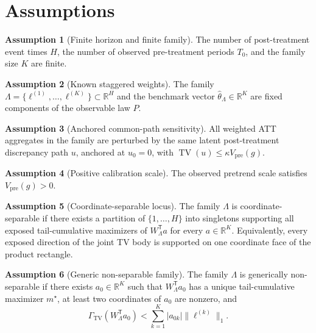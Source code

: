 \documentclass[11pt]{article}
\newcommand{\transpose}{\mathsf{T}}
\newcommand{\R}{\mathbb{R}}
\theoremstyle{definition}
\newtheorem{assumption}{Assumption}
\theoremstyle{plain}
\theoremstyle{remark}
\begin{document}
\section{Assumptions}
\begin{assumption}[Finite horizon and finite family]\label{ass:finite}
The number of post-treatment event times \(H\), the number of observed pre-treatment periods \(T_0\), and the family size \(K\) are finite.
\end{assumption}

\begin{assumption}[Known staggered weights]\label{ass:weights}
The family \(\Lambda=\{\ell^{(1)},\ldots,\ell^{(K)}\}\subset\R^H\) and the benchmark vector \(\hat\theta_\Lambda\in\R^K\) are fixed components of the observable law \(P\).
\end{assumption}

\begin{assumption}[Anchored common-path sensitivity]\label{ass:tv}
All weighted ATT aggregates in the family are perturbed by the same latent post-treatment discrepancy path \(u\), anchored at \(u_0=0\), with \(\operatorname{TV}(u)\le \kappa V_{\mathrm{pre}}(g)\).
\end{assumption}

\begin{assumption}[Positive calibration scale]\label{ass:scale}
The observed pretrend scale satisfies \(V_{\mathrm{pre}}(g)>0\).
\end{assumption}

\begin{assumption}[Coordinate-separable locus]\label{ass:separable}
The family \(\Lambda\) is coordinate-separable if there exists a partition of \(\{1,\ldots,H\}\) into singletons supporting all exposed tail-cumulative maximizers of \(W_\Lambda^\transpose a\) for every \(a\in\R^K\). Equivalently, every exposed direction of the joint TV body is supported on one coordinate face of the product rectangle.
\end{assumption}

\begin{assumption}[Generic non-separable family]\label{ass:generic}
The family \(\Lambda\) is generically non-separable if there exists \(a_0\in\R^K\) such that \(W_\Lambda^\transpose a_0\) has a unique tail-cumulative maximizer \(m^\star\), at least two coordinates of \(a_0\) are nonzero, and
\[
\Gamma_{\mathrm{TV}}(W_\Lambda^\transpose a_0)
<
\sum_{k=1}^K |a_{0k}|\|\ell^{(k)}\|_1.
\]
\end{assumption}
\end{document}
